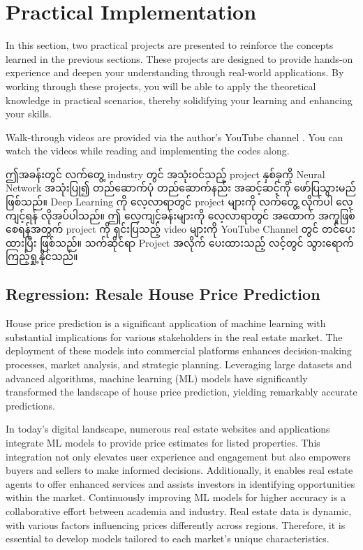 \newpage
\section{Practical Implementation}\label{sec:hands-on}
In this section, two practical projects are presented to reinforce the concepts learned in the previous sections. These projects are designed to provide hands-on experience and deepen your understanding through real-world applications. By working through these projects, you will be able to apply the theoretical knowledge in practical scenarios, thereby solidifying your learning and enhancing your skills. 

Walk-through videos are provided via the author's YouTube channel \cite{web:myoYouTube}. You can watch the videos while reading and implementing the codes along.

ဤအခန်းတွင် လက်တွေ့  industry တွင် အသုံး၀င်သည့် project နှစ်ခုကို Neural Network အသုံးပြု၍ တည်ဆောက်ပုံ တည်ဆောက်နည်း အဆင့်ဆင့်ကို ဖော်ပြသွားမည် ဖြစ်သည်။ Deep Learning ကို လေ့လာရာတွင် project များကို လက်တွေ့  လိုက်ပါ လေ့ကျင့်ရန် လိုအပ်ပါသည်။ ဤ လေ့ကျင့်ခန်းများကို လေ့လာရာတွင် အထောက် အကူဖြစ်စေရန်အတွက် project ကို ရှင်းပြသည့် video များကို YouTube Channel တွင် တင်ပေးထားပြီး ဖြစ်သည်။ သက်ဆိုင်ရာ Project အလိုက် ပေးထားသည့် လင့်တွင် သွားရောက် ကြည့်ရှု့နိုင်သည်။ 

\subsection{Regression: Resale House Price Prediction}\label{sec:SGHDB}

House price prediction is a significant application of machine learning with substantial implications for various stakeholders in the real estate market. The deployment of these models into commercial platforms enhances decision-making processes, market analysis, and strategic planning. Leveraging large datasets and advanced algorithms, machine learning (ML) models have significantly transformed the landscape of house price prediction, yielding remarkably accurate predictions.

In today's digital landscape, numerous real estate websites and applications integrate ML models to provide price estimates for listed properties. This integration not only elevates user experience and engagement but also empowers buyers and sellers to make informed decisions. Additionally, it enables real estate agents to offer enhanced services and assists investors in identifying opportunities within the market. Continuously improving ML models for higher accuracy is a collaborative effort between academia and industry. Real estate data is dynamic, with various factors influencing prices differently across regions. Therefore, it is essential to develop models tailored to each market's unique characteristics.

